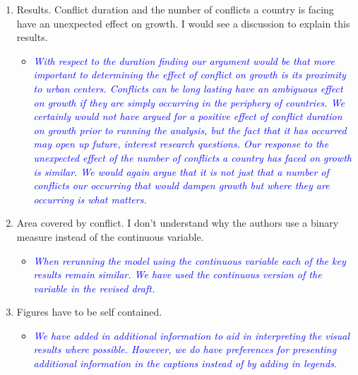 \begin{enumerate}
\item Results. Conflict duration and the number of conflicts a country is facing have an unexpected effect on growth. I would see a discussion to explain this results.

\begin{itemize}
\item \textcolor{blue}{\emph{
	With respect to the duration finding our argument would be that more important to determining the effect of conflict on growth is its proximity to urban centers. Conflicts can be long lasting have an ambiguous effect on growth if they are simply occurring in the periphery of countries. We certainly would not have argued for a positive effect of conflict duration on growth prior to running the analysis, but the fact that it has occurred may open up future, interest research questions. 
	Our response to the unexpected effect of the number of conflicts a country has faced on growth is similar. We would again argue that it is not just that a number of conflicts our occurring that would dampen growth but where they are occurring is what matters. 
}}
\end{itemize}

\item Area covered by conflict. I don’t understand why the authors use a binary measure instead of the continuous variable.

\begin{itemize}
\item \textcolor{blue}{\emph{
	When rerunning the model using the continuous variable each of the key results remain similar. We have used the continuous version of the variable in the revised draft.
}}
\end{itemize}


	

\item Figures have to be self contained.

\begin{itemize}
\item \textcolor{blue}{\emph{
	We have added in additional information to aid in interpreting the visual results where possible. However, we do have preferences for presenting additional information in the captions instead of by adding in legends.
}}
\end{itemize}


\end{enumerate}
